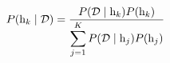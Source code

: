 \begin{equation}
    P( \mathrm{h}_{k} \mid \mathcal{D} ) = \frac{P( \mathcal{D} \mid \mathrm{h}_{k} ) P( \mathrm{h}_{k} )}{\displaystyle\sum_{j=1}^{K} P( \mathcal{D} \mid \mathrm{h}_{j} ) P( \mathrm{h}_{j} )}
\label{eq:gen_bayes}
\end{equation}


